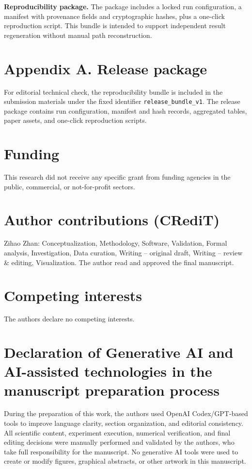\documentclass[preprint,12pt]{elsarticle}
\begin{document}
\textbf{Reproducibility package.} The package includes a locked run configuration, a manifest with provenance fields and cryptographic hashes, plus a one-click reproduction script. This bundle is intended to support independent result regeneration without manual path reconstruction.

\section*{Appendix A. Release package}
For editorial technical check, the reproducibility bundle is included in the submission materials under the fixed identifier \texttt{release\_bundle\_v1}.
The release package contains run configuration, manifest and hash records, aggregated tables, paper assets, and one-click reproduction scripts.

\section*{Funding}
This research did not receive any specific grant from funding agencies in the public, commercial, or not-for-profit sectors.

\section*{Author contributions (CRediT)}
Zihao Zhan: Conceptualization, Methodology, Software, Validation, Formal analysis, Investigation, Data curation, Writing -- original draft, Writing -- review \& editing, Visualization. The author read and approved the final manuscript.

\section*{Competing interests}
The authors declare no competing interests.

\section*{Declaration of Generative AI and AI-assisted technologies in the manuscript preparation process}
During the preparation of this work, the authors used OpenAI Codex/GPT-based tools to improve language clarity, section organization, and editorial consistency. All scientific content, experiment execution, numerical verification, and final editing decisions were manually performed and validated by the authors, who take full responsibility for the manuscript. No generative AI tools were used to create or modify figures, graphical abstracts, or other artwork in this manuscript.



\end{document}
